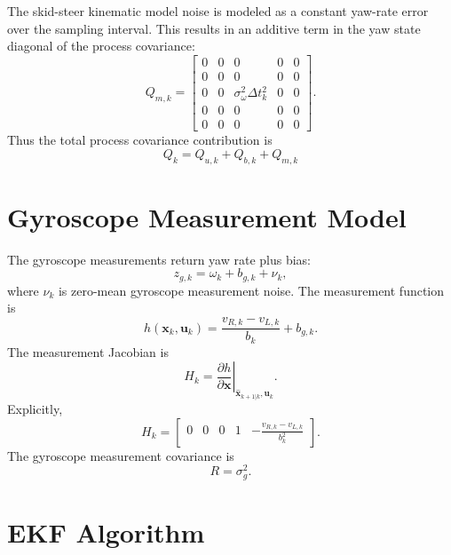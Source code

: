 \documentclass[11pt]{article}
\begin{document}
The skid-steer kinematic model noise is modeled as a constant yaw-rate error over the sampling interval. This results in an additive term in the yaw state diagonal of the process covariance:
\begin{equation}
Q_{m,k}
=
\begin{bmatrix}
0 & 0 & 0 & 0 & 0 \\
0 & 0 & 0 & 0 & 0 \\
0 & 0 & \sigma_{\omega}^2 \Delta t_k^2 & 0 & 0 \\
0 & 0 & 0 & 0 & 0 \\
0 & 0 & 0 & 0 & 0
\end{bmatrix}.
\end{equation}
Thus the total process covariance contribution is
\begin{equation}
Q_{k}
=
Q_{u,k} + Q_{b,k} + Q_{m,k}
\end{equation}

\section{Gyroscope Measurement Model}

The gyroscope measurements return yaw rate plus bias:
\begin{equation}
z_{g,k}
=
\omega_k
+
b_{g,k}
+
\nu_k,
\end{equation}
where $\nu_k$ is zero-mean gyroscope measurement noise. The measurement function is
\begin{equation}
h(\mathbf{x}_k,\mathbf{u}_k)
=
\frac{v_{R,k}-v_{L,k}}{b_k}
+
b_{g,k}.
\end{equation}
The measurement Jacobian is
\begin{equation}
H_k
=
\left.
\frac{\partial h}{\partial \mathbf{x}}
\right|_{\hat{\mathbf{x}}_{k+1|k},\mathbf{u}_k}.
\end{equation}
Explicitly,
\begin{equation}
H_k
=
\begin{bmatrix}
0 &
0 &
0 &
1 &
-\frac{v_{R,k}-v_{L,k}}{b_k^2}
\end{bmatrix}.
\end{equation}
The gyroscope measurement covariance is
\begin{equation}
R =
\sigma_g^2.
\end{equation}

\section{EKF Algorithm}
\end{document}
